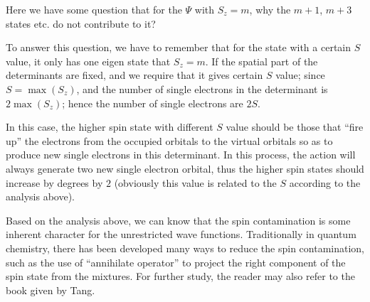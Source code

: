 Here we have some question that for the $\Psi$ with $S_{z} = m$, why
the $m+1$, $m+3$ states etc. do not contribute to it?

To answer this question, we have to remember that for the state with a
certain $S$ value, it only has one eigen state that $S_{z} = m$.  If
the spatial part of the determinants are fixed, and we require that it
gives certain $S$ value; since $S = \max (S_{z})$, and the number of
single electrons in the determinant is $2\max (S_{z})$; hence the
number of single electrons are $2S$. 

In this case, the higher spin state with different $S$ value should be
those that ``fire up'' the electrons from the occupied orbitals to the
virtual orbitals so as to produce new single electrons in this
determinant. In this process, the action will always generate two new
single electron orbital, thus the higher spin states should increase
by degrees by $2$ (obviously this value is related to the $S$
according to the analysis above).

Based on the analysis above, we can know that the spin contamination
is some inherent character for the unrestricted wave functions.
Traditionally in quantum chemistry, there has been developed many
ways to reduce the spin contamination, such as the use of
``annihilate operator'' to project the right component of the spin
state from the mixtures. For further study, the reader may also
refer to the book given by Tang\cite{aoqingTang}.



